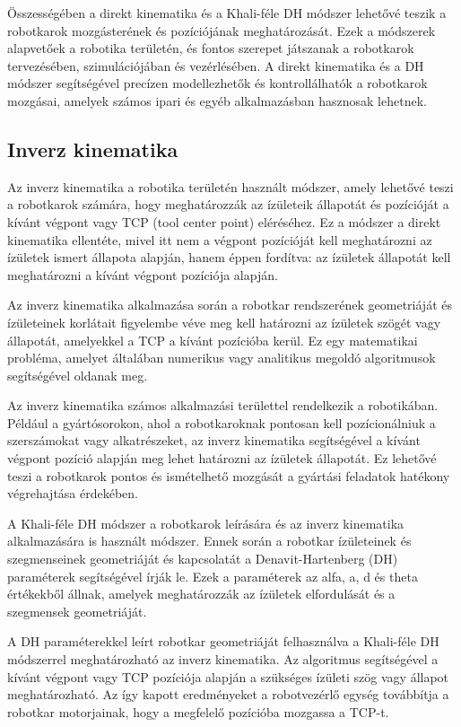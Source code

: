 Összességében a direkt kinematika és a Khali-féle DH módszer lehetővé teszik a robotkarok mozgásterének és pozíciójának meghatározását. Ezek a módszerek alapvetőek a robotika területén, és fontos szerepet játszanak a robotkarok tervezésében, szimulációjában és vezérlésében. A direkt kinematika és a DH módszer segítségével precízen modellezhetők és kontrollálhatók a robotkarok mozgásai, amelyek számos ipari és egyéb alkalmazásban hasznosak lehetnek.

\subsection{Inverz kinematika}
Az inverz kinematika a robotika területén használt módszer, amely lehetővé teszi a robotkarok számára, hogy meghatározzák az ízületeik állapotát és pozícióját a kívánt végpont vagy TCP (tool center point) eléréséhez. Ez a módszer a direkt kinematika ellentéte, mivel itt nem a végpont pozícióját kell meghatározni az ízületek ismert állapota alapján, hanem éppen fordítva: az ízületek állapotát kell meghatározni a kívánt végpont pozíciója alapján.

Az inverz kinematika alkalmazása során a robotkar rendszerének geometriáját és ízületeinek korlátait figyelembe véve meg kell határozni az ízületek szögét vagy állapotát, amelyekkel a TCP a kívánt pozícióba kerül. Ez egy matematikai probléma, amelyet általában numerikus vagy analitikus megoldó algoritmusok segítségével oldanak meg.

Az inverz kinematika számos alkalmazási területtel rendelkezik a robotikában. Például a gyártósorokon, ahol a robotkaroknak pontosan kell pozícionálniuk a szerszámokat vagy alkatrészeket, az inverz kinematika segítségével a kívánt végpont pozíció alapján meg lehet határozni az ízületek állapotát. Ez lehetővé teszi a robotkarok pontos és ismételhető mozgását a gyártási feladatok hatékony végrehajtása érdekében.

A Khali-féle DH módszer a robotkarok leírására és az inverz kinematika alkalmazására is használt módszer. Ennek során a robotkar ízületeinek és szegmenseinek geometriáját és kapcsolatát a Denavit-Hartenberg (DH) paraméterek segítségével írják le. Ezek a paraméterek az alfa, a, d és theta értékekből állnak, amelyek meghatározzák az ízületek elfordulását és a szegmensek geometriáját.

A DH paraméterekkel leírt robotkar geometriáját felhasználva a Khali-féle DH módszerrel meghatározható az inverz kinematika. Az algoritmus segítségével a kívánt végpont vagy TCP pozíciója alapján a szükséges ízületi szög vagy állapot meghatározható. Az így kapott eredményeket a robotvezérlő egység továbbítja a robotkar motorjainak, hogy a megfelelő pozícióba mozgassa a TCP-t.

